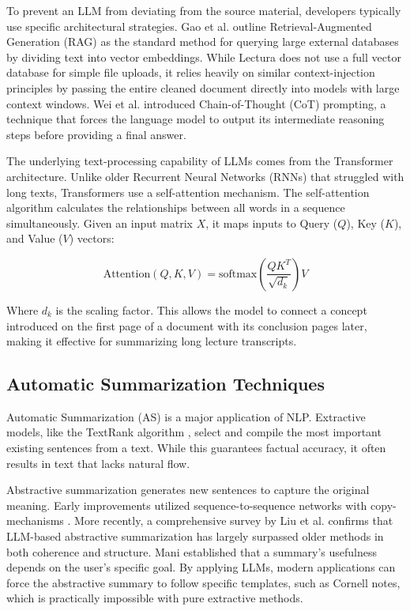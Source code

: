 To prevent an LLM from deviating from the source material, developers typically use specific architectural strategies. Gao et al. \cite{gao2023retrieval} outline Retrieval-Augmented Generation (RAG) as the standard method for querying large external databases by dividing text into vector embeddings. While Lectura does not use a full vector database for simple file uploads, it relies heavily on similar context-injection principles by passing the entire cleaned document directly into models with large context windows. Wei et al. \cite{wei2022chain} introduced Chain-of-Thought (CoT) prompting, a technique that forces the language model to output its intermediate reasoning steps before providing a final answer.

The underlying text-processing capability of LLMs comes from the Transformer architecture. Unlike older Recurrent Neural Networks (RNNs) that struggled with long texts, Transformers use a self-attention mechanism. The self-attention algorithm calculates the relationships between all words in a sequence simultaneously. Given an input matrix $X$, it maps inputs to Query ($Q$), Key ($K$), and Value ($V$) vectors:

\begin{equation}
    \text{Attention}(Q, K, V) = \text{softmax}\left(\frac{QK^T}{\sqrt{d_k}}\right)V
\end{equation}

Where $d_k$ is the scaling factor. This allows the model to connect a concept introduced on the first page of a document with its conclusion pages later, making it effective for summarizing long lecture transcripts.

\subsection{Automatic Summarization Techniques}
Automatic Summarization (AS) is a major application of NLP. Extractive models, like the TextRank algorithm \cite{mihalcea2004textrank}, select and compile the most important existing sentences from a text. While this guarantees factual accuracy, it often results in text that lacks natural flow.

Abstractive summarization generates new sentences to capture the original meaning. Early improvements utilized sequence-to-sequence networks with copy-mechanisms \cite{see2017get}. More recently, a comprehensive survey by Liu et al. \cite{liu2023summary} confirms that LLM-based abstractive summarization has largely surpassed older methods in both coherence and structure. Mani \cite{mani2001automatic} established that a summary's usefulness depends on the user's specific goal. By applying LLMs, modern applications can force the abstractive summary to follow specific templates, such as Cornell notes, which is practically impossible with pure extractive methods.


